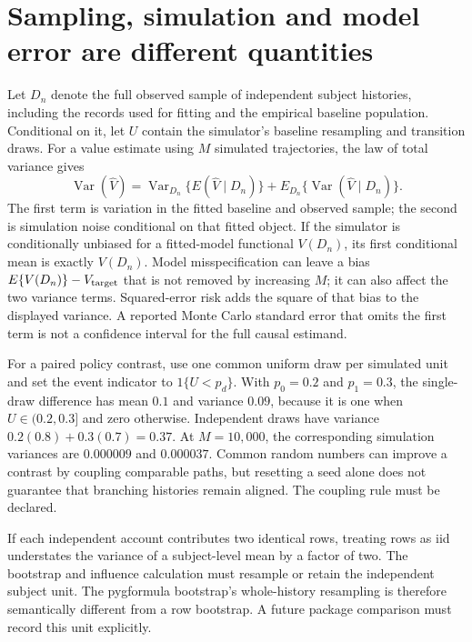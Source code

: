 \section{Sampling, simulation and model error are different quantities}
\label{exec17:s5-uncertainty}

Let $D_n$ denote the full observed sample of independent subject histories,
including the records used for fitting and the empirical baseline population.
Conditional on it, let $U$ contain the simulator's baseline resampling and
transition draws. For a value estimate using $M$ simulated trajectories,
the law of total variance gives
\begin{equation}
 \operatorname{Var}(\widehat V)=
 \operatorname{Var}_{D_n}\{E(\widehat V\mid D_n)\}+
 E_{D_n}\{\operatorname{Var}(\widehat V\mid D_n)\}.
 \label{exec17:s5-total-variance}
\end{equation}
The first term is variation in the fitted baseline and observed sample; the
second is simulation noise conditional on that fitted object. If the simulator
is conditionally unbiased for a fitted-model functional $V(D_n)$, its first
conditional mean is exactly $V(D_n)$. Model misspecification can leave a
bias $E\{V(D_n)\}-V_{\rm target}$ that is not removed by increasing $M$; it
can also affect the two variance terms. Squared-error risk adds the square
of that bias to the displayed variance. A
reported Monte Carlo standard error that omits the first term is not a
confidence interval for the full causal estimand.

For a paired policy contrast, use one common uniform draw per simulated unit
and set the event indicator to $1\{U<p_d\}$. With $p_0=0.2$ and $p_1=0.3$, the
single-draw difference has mean $0.1$ and variance $0.09$, because it is one
when $U\in(0.2,0.3]$ and zero otherwise. Independent draws have variance
$0.2(0.8)+0.3(0.7)=0.37$. At $M=10{,}000$, the corresponding simulation
variances are $0.000009$ and $0.000037$. Common random numbers can improve a
contrast by coupling comparable paths, but resetting a seed alone does not
guarantee that branching histories remain aligned. The coupling rule must be
declared.

If each independent account contributes two identical rows, treating rows as
iid understates the variance of a subject-level mean by a factor of two. The
bootstrap and influence calculation must resample or retain the independent
subject unit. The pygformula bootstrap's whole-history resampling is therefore
semantically different from a row bootstrap. A future package comparison must
record this unit explicitly.\citep{v131_sw_pygformula,exec17_s5_math}

